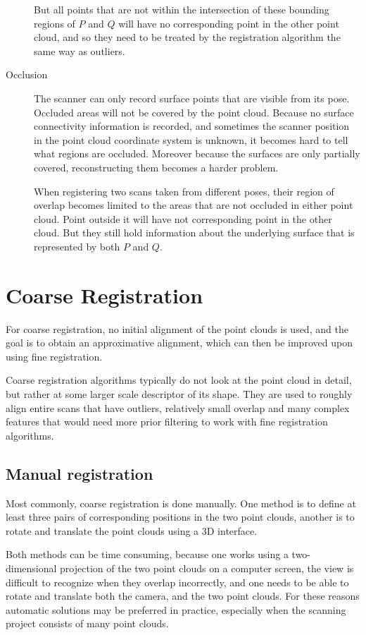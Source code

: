 \begin{description}
But all points that are not within the intersection of these bounding regions of $P$ and $Q$ will have no corresponding point in the other point cloud, and so they need to be treated by the registration algorithm the same way as outliers.

\item[Occlusion] The scanner can only record surface points that are visible from its pose. Occluded areas will not be covered by the point cloud. Because no surface connectivity information is recorded, and sometimes the scanner position in the point cloud coordinate system is unknown, it becomes hard to tell what regions are occluded. Moreover because the surfaces are only partially covered, reconstructing them becomes a harder problem.

When registering two scans taken from different poses, their region of overlap becomes limited to the areas that are not occluded in either point cloud. Point outside it will have not corresponding point in the other cloud. But they still hold information about the underlying surface that is represented by both $P$ and $Q$.
\end{description} 


\section{Coarse Registration}
For coarse registration, no initial alignment of the point clouds is used, and the goal is to obtain an approximative alignment, which can then be improved upon using fine registration.

Coarse registration algorithms typically do not look at the point cloud in detail, but rather at some larger scale descriptor of its shape. They are used to roughly align entire scans that have outliers, relatively small overlap and many complex features that would need more prior filtering to work with fine registration algorithms.

\subsection{Manual registration}
Most commonly, coarse registration is done manually. One method is to define at least three pairs of corresponding positions in the two point clouds, another is to rotate and translate the point clouds using a 3D interface.

Both methods can be time consuming, because one works using a two-dimensional projection of the two point clouds on a computer screen, the view is difficult to recognize when they overlap incorrectly, and one needs to be able to rotate and translate both the camera, and the two point clouds. For these reasons automatic solutions may be preferred in practice, especially when the scanning project consists of many point clouds.

